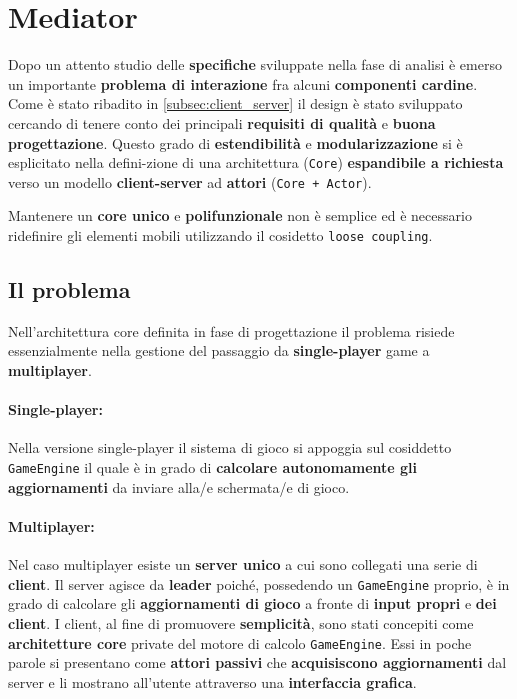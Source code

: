 \section{Mediator}
\label{sec:mediator_design}

Dopo un attento studio delle \textbf{specifiche} sviluppate nella fase di analisi è emerso un importante \textbf{problema di interazione} fra alcuni \textbf{componenti cardine}. Come è stato ribadito in \ref{subsec:client_server} il design è stato sviluppato cercando di tenere conto dei principali \textbf{requisiti di qualità} e \textbf{buona progettazione}. Questo grado di \textbf{estendibilità} e \textbf{modularizzazione} si è esplicitato nella defini-zione di una architettura (\texttt{Core}) \textbf{espandibile a richiesta} verso un modello \textbf{client-server} ad \textbf{attori} (\texttt{Core + Actor}).

Mantenere un \textbf{core unico} e \textbf{polifunzionale} non è semplice ed è necessario ridefinire gli elementi mobili utilizzando il cosidetto \texttt{loose coupling}. 

\subsection{Il problema}
Nell'architettura core definita in fase di progettazione il problema risiede essenzialmente nella gestione del passaggio da \textbf{single-player} game a \textbf{multiplayer}. 

\paragraph{Single-player:}
Nella versione single-player il sistema di gioco si appoggia sul cosiddetto \texttt{GameEngine} il quale è in grado di \textbf{calcolare autonomamente gli aggiornamenti} da inviare alla/e schermata/e di gioco.

\paragraph{Multiplayer:}
Nel caso multiplayer esiste un \textbf{server unico} a cui sono collegati una serie di \textbf{client}. Il server agisce da \textbf{leader} poiché, possedendo un \texttt{GameEngine} proprio, è in grado di calcolare gli \textbf{aggiornamenti di gioco} a fronte di \textbf{input propri} e \textbf{dei client}. I client, al fine di promuovere \textbf{semplicità}, sono stati concepiti come \textbf{architetture core} private del motore di calcolo \texttt{GameEngine}. Essi in poche parole si presentano come \textbf{attori passivi} che \textbf{acquisiscono aggiornamenti} dal server e li mostrano all'utente attraverso una \textbf{interfaccia grafica}.


